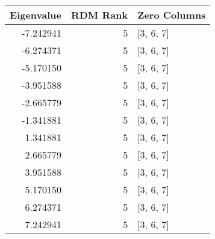 \begin{tabular}{rrl}
\toprule
Eigenvalue & RDM Rank & Zero Columns \\
\midrule
-7.242941 & 5 & [3, 6, 7] \\
-6.274371 & 5 & [3, 6, 7] \\
-5.170150 & 5 & [3, 6, 7] \\
-3.951588 & 5 & [3, 6, 7] \\
-2.665779 & 5 & [3, 6, 7] \\
-1.341881 & 5 & [3, 6, 7] \\
1.341881 & 5 & [3, 6, 7] \\
2.665779 & 5 & [3, 6, 7] \\
3.951588 & 5 & [3, 6, 7] \\
5.170150 & 5 & [3, 6, 7] \\
6.274371 & 5 & [3, 6, 7] \\
7.242941 & 5 & [3, 6, 7] \\
\bottomrule
\end{tabular}
